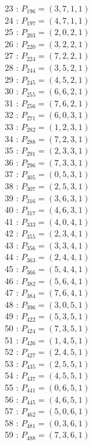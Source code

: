 \documentclass{article}
\begin{document}
{\begin{multicols}{3}
23 : $P_{196}=( 3, 7, 1, 1 )$\\
24 : $P_{197}=( 4, 7, 1, 1 )$\\
25 : $P_{203}=( 2, 0, 2, 1 )$\\
26 : $P_{220}=( 3, 2, 2, 1 )$\\
27 : $P_{224}=( 7, 2, 2, 1 )$\\
28 : $P_{244}=( 3, 5, 2, 1 )$\\
29 : $P_{245}=( 4, 5, 2, 1 )$\\
30 : $P_{255}=( 6, 6, 2, 1 )$\\
31 : $P_{256}=( 7, 6, 2, 1 )$\\
32 : $P_{271}=( 6, 0, 3, 1 )$\\
33 : $P_{282}=( 1, 2, 3, 1 )$\\
34 : $P_{288}=( 7, 2, 3, 1 )$\\
35 : $P_{291}=( 2, 3, 3, 1 )$\\
36 : $P_{296}=( 7, 3, 3, 1 )$\\
37 : $P_{305}=( 0, 5, 3, 1 )$\\
38 : $P_{307}=( 2, 5, 3, 1 )$\\
39 : $P_{316}=( 3, 6, 3, 1 )$\\
40 : $P_{317}=( 4, 6, 3, 1 )$\\
41 : $P_{333}=( 4, 0, 4, 1 )$\\
42 : $P_{355}=( 2, 3, 4, 1 )$\\
43 : $P_{356}=( 3, 3, 4, 1 )$\\
44 : $P_{363}=( 2, 4, 4, 1 )$\\
45 : $P_{366}=( 5, 4, 4, 1 )$\\
46 : $P_{382}=( 5, 6, 4, 1 )$\\
47 : $P_{384}=( 7, 6, 4, 1 )$\\
48 : $P_{396}=( 3, 0, 5, 1 )$\\
49 : $P_{422}=( 5, 3, 5, 1 )$\\
50 : $P_{424}=( 7, 3, 5, 1 )$\\
51 : $P_{426}=( 1, 4, 5, 1 )$\\
52 : $P_{427}=( 2, 4, 5, 1 )$\\
53 : $P_{435}=( 2, 5, 5, 1 )$\\
54 : $P_{437}=( 4, 5, 5, 1 )$\\
55 : $P_{441}=( 0, 6, 5, 1 )$\\
56 : $P_{445}=( 4, 6, 5, 1 )$\\
57 : $P_{462}=( 5, 0, 6, 1 )$\\
58 : $P_{481}=( 0, 3, 6, 1 )$\\
59 : $P_{488}=( 7, 3, 6, 1 )$\\

\end{multicols}}
\end{document}
